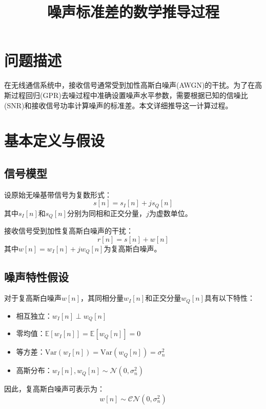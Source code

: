 \documentclass[12pt]{article}
\title{噪声标准差的数学推导过程}
\author{}
\date{}
\begin{document}
\maketitle

\section{问题描述}

在无线通信系统中，接收信号通常受到加性高斯白噪声(AWGN)的干扰。为了在高斯过程回归(GPR)去噪过程中准确设置噪声水平参数，需要根据已知的信噪比(SNR)和接收信号功率计算噪声的标准差。本文详细推导这一计算过程。

\section{基本定义与假设}

\subsection{信号模型}

设原始无噪基带信号为复数形式：
\begin{equation}
s[n] = s_I[n] + js_Q[n]
\end{equation}
其中$s_I[n]$和$s_Q[n]$分别为同相和正交分量，$j$为虚数单位。

接收信号受到加性复高斯白噪声的干扰：
\begin{equation}
r[n] = s[n] + w[n]
\end{equation}
其中$w[n] = w_I[n] + jw_Q[n]$为复高斯白噪声。

\subsection{噪声特性假设}

对于复高斯白噪声$w[n]$，其同相分量$w_I[n]$和正交分量$w_Q[n]$具有以下特性：
\begin{itemize}
\item 相互独立：$w_I[n] \perp w_Q[n]$
\item 零均值：$\mathbb{E}[w_I[n]] = \mathbb{E}[w_Q[n]] = 0$
\item 等方差：$\text{Var}(w_I[n]) = \text{Var}(w_Q[n]) = \sigma_n^2$
\item 高斯分布：$w_I[n], w_Q[n] \sim \mathcal{N}(0, \sigma_n^2)$
\end{itemize}

因此，复高斯白噪声可表示为：
\begin{equation}
w[n] \sim \mathcal{CN}(0, \sigma_n^2)
\end{equation}
\end{document}
